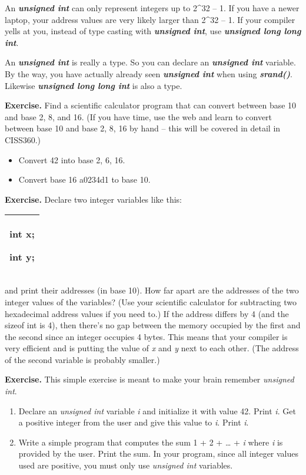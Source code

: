 \documentclass[
]{article}
\providecommand{\tightlist}{%
  \setlength{\itemsep}{0pt}\setlength{\parskip}{0pt}}
\begin{document}
An \emph{\textbf{unsigned int}} can only represent integers up to
2\^{}32 -- 1. If you have a newer laptop, your address values are very
likely larger than 2\^{}32 -- 1. If your compiler yells at you, instead
of type casting with \emph{\textbf{unsigned int}}, use
\emph{\textbf{unsigned long long int}}.

An \emph{\textbf{unsig}\textbf{n}\textbf{ed int}} is really a type. So
you can declare an \emph{\textbf{unsigned int}} variable. By the way,
you have actually already seen \emph{\textbf{unsigned int}} when using
\emph{\textbf{srand()}}. Likewise \emph{\textbf{unsigned long long int}}
is also a type.

\textbf{Exercise.} Find a scientific calculator program that can convert
between base 10 and base 2, 8, and 16. (If you have time, use the web
and learn to convert between base 10 and base 2, 8, 16 by hand -- this
will be covered in detail in CISS360.)

\begin{itemize}
\tightlist
\item
  Convert 42 into base 2, 6, 16.
\item
  Convert base 16 a0234d1 to base 10.
\end{itemize}

\textbf{Exercise.} Declare two integer variables like this:

\begin{longtable}[]{@{}l@{}}
\toprule
\endhead
\begin{minipage}[t]{0.97\columnwidth}\raggedright
int x;

int y;\strut
\end{minipage}\tabularnewline
\bottomrule
\end{longtable}

and print their addresses (in base 10). How far apart are the addresses
of the two integer values of the variables? (Use your scientific
calculator for subtracting two hexadecimal address values if you need
to.) If the address differs by 4 (and the sizeof int is 4), then there's
no gap between the memory occupied by the first and the second since an
integer occupies 4 bytes. This means that your compiler is very
efficient and is putting the value of \emph{x} and \emph{y} next to each
other. (The address of the second variable is probably smaller.)

\textbf{Exercise.} This simple exercise is meant to make your brain
remember \emph{unsigned int}.

\begin{enumerate}
\def\labelenumi{(\alph{enumi})}
\tightlist
\item
  Declare an \emph{unsigned int} variable \emph{i} and initialize it
  with value 42. Print \emph{i}. Get a positive integer from the user
  and give this value to \emph{i}. Print \emph{i}.
\item
  Write a simple program that computes the sum 1 + 2 + \ldots{} +
  \emph{i} where \emph{i} is provided by the user. Print the sum. In
  your program, since all integer values used are positive, you must
  only use \emph{unsigned int} variables.
\end{enumerate}
\end{document}
